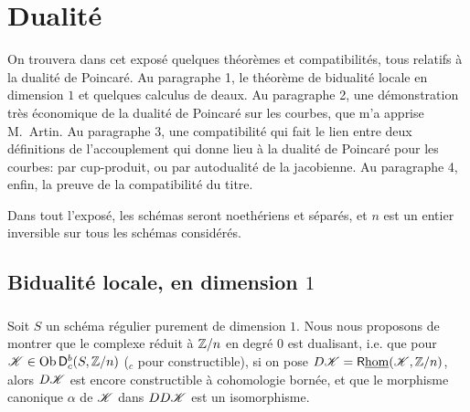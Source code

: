 
\chapter{Dualité}\label{V}




















On trouvera dans cet expos\'e quelques th\'eor\`emes et compatibilit\'es, tous 
relatifs \`a la dualit\'e de Poincar\'e. Au paragraphe 1, le th\'eor\`eme de 
bidualit\'e locale en dimension $1$ \cite[I.5.1]{sga5} et quelques calculus de 
deaux. Au paragraphe 2, une d\'emonstration tr\`es \'economique de la dualit\'e 
de Poincar\'e sur les courbes, que m'a apprise M.\ Artin. Au paragraphe 3, une 
compatibilit\'e qui fait le lien entre deux d\'efinitions de l'accouplement qui 
donne lieu \`a la dualit\'e de Poincar\'e pour les courbes: par cup-produit, ou 
par autodualit\'e de la jacobienne. Au paragraphe 4, enfin, la preuve de la 
compatibilit\'e du titre. 

Dans tout l'expos\'e, les sch\'emas seront noeth\'eriens et s\'epar\'es, et $n$ 
est un entier inversible sur tous les sch\'emas consid\'er\'es. 










\section{Bidualit\'e locale, en dimension $1$}\label{V:1}





\subsection{}\label{V:1-1}

Soit $S$ un sch\'ema r\'egulier purement de dimension $1$. Nous nous proposons 
de montrer que le complexe r\'eduit \`a $\mathbb{Z}/n$ en degr\'e $0$ est 
dualisant, i.e. que pour $\mathscr{K}\in \operatorname{Ob}\mathsf{D}_c^b(S,\mathbb{Z}/n)$ ($_c$ pour constructible), 
si on pose $D\mathscr{K}=\mathsf{R}\underline\hom(\mathscr{K},\mathbb{Z}/n)$, alors $D\mathscr{K}$ est encore 
constructible \`a cohomologie born\'ee, et que le morphisme canonique $\alpha$ 
de $\mathscr{K}$ dans $D D\mathscr{K}$ est un isomorphisme. 

